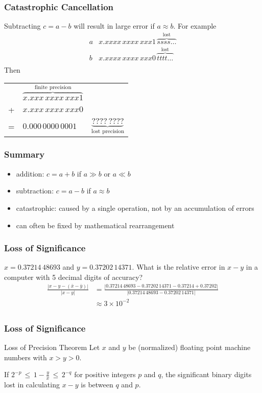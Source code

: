 \documentclass[10pt]{beamer}
\begin{document}
\begin{frame}
\frametitle{Catastrophic Cancellation}
Subtracting $c=a-b$ will result in large error if $a \approx b$.
For example
\begin{align*}
  a & x.xxxx\,xxxx\,xxx1\,\overbrace{ssss\dots}^{\text{lost}}\\
  b & x.xxxx\,xxxx\,xxx0\,\overbrace{tttt\dots}^{\text{lost}}\\
\end{align*}
Then\qquad
\begin{tabular}{c l l}
& $\overbrace{x.xxx\,xxxx\,xxx1}^{\text{finite precision}}$& \\
+& $x.xxx\,xxxx\,xxx0$\\\hline
=& $0.000\,0000\,0001$ & $\underbrace{????\,????}_{\text{lost precision}}$\\
\end{tabular}
\end{frame}
\begin{frame}
\frametitle{Summary}
\begin{itemize}
\item addition: $c=a+b$ if $a\gg b$ or $a \ll b$
\item subtraction: $c=a-b$ if $a \approx b$
\item catastrophic: caused by a single operation, not by an accumulation of
errors
\item can often be fixed by mathematical rearrangement
\end{itemize}
\end{frame}
\begin{frame}
\frametitle{Loss of Significance}
\begin{example}
  $x = 0.37214\,48693$ and
  $y = 0.37202\,14371$.  What is the relative error in $x-y$ in a
computer with 5 decimal digits of accuracy?
\begin{align*}
  \frac{|x-y - (\bar{x}-\bar{y})|}{|x-y|} 
& = \frac{|0.37214\,48693 - 0.37202\,14371 - 0.37214 +
0.37202|}{|0.37214\,48693 - 0.37202\,14371|}\\
& \approx 3\times 10^{-2}\\
\end{align*}
\end{example}
\end{frame}
\begin{frame}
\frametitle{Loss of Significance}
\begin{block}{Loss of Precision Theorem}
  Let $x$ and $y$ be (normalized) floating point machine numbers with
$x>y>0$.
\bigskip

If $2^{-p} \,\leq\, 1-\frac{y}{x} \,\leq\, 2^{-q}$ for positive integers $p$
and $q$, the significant binary digits lost in calculating $x-y$ is between $q$ and $p$.
\end{block}
\end{frame}
\end{document}
